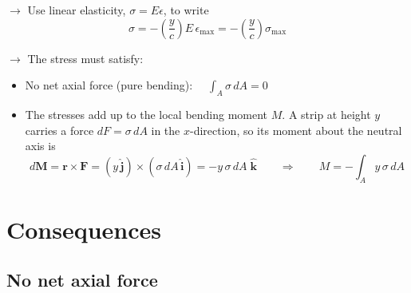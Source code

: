 \documentclass[11pt]{article}
\begin{document}
\noindent
\begin{minipage}[c]{0.35\textwidth}
\centering
{}
\end{minipage}%
\hfill
\begin{minipage}[c]{0.62\textwidth}
$\rightarrow$ Use linear elasticity, $\sigma = E\epsilon$, to write
\[
  \boxed{\sigma = -\left(\frac{y}{c}\right)E\,\epsilon_{\max}
         = -\left(\frac{y}{c}\right)\sigma_{\max}}
\]
\end{minipage}

\bigskip
\noindent
$\rightarrow$ The stress must satisfy:
\begin{itemize}[label={}, leftmargin=2.5em]
  \item[\circnum{1}] No net axial force (pure bending):
        $\displaystyle \quad \int_A \sigma\, dA = 0$
  \item[\circnum{2}] The stresses add up to the local bending moment $M$.
      A strip at height $y$ carries a force $dF = \sigma\,dA$ in the $x$-direction,
      so its moment about the neutral axis is
      \[
        d\mathbf{M} = \mathbf{r}\times\mathbf{F}
        = (y\,\hat{\mathbf{j}})\times(\sigma\,dA\,\hat{\mathbf{i}})
        = -y\,\sigma\,dA\;\hat{\mathbf{k}}
        \qquad\Rightarrow\qquad
        M = -\int_A y\,\sigma\,dA
      \]
\end{itemize}
\noindent

\section*{Consequences}

\subsection*{\protect{} No net axial force}
\end{document}
